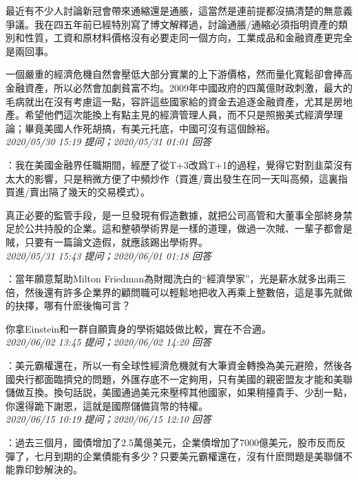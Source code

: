 \documentclass[twocolumn]{ctexart}
\begin{document}
最近有不少人討論新冠會帶來通縮還是通脹，這當然是連前提都沒搞清楚的無意義爭議。我在四五年前已經特別寫了博文解釋過，討論通脹/通縮必須指明資產的類別和性質，工資和原材料價格沒有必要走同一個方向，工業成品和金融資產更完全是兩回事。

一個嚴重的經濟危機自然會壓低大部分實業的上下游價格，然而量化寬鬆卻會捧高金融資產，所以必然會加劇貧富不均。2009年中國政府的四萬億財政刺激，最大的毛病就出在沒有考慮這一點，容許這些國家給的資金去追逐金融資產，尤其是房地產。希望他們這次能換上有點主見的經濟管理人員，而不只是照搬美式經濟學理論；畢竟美國人作死胡搞，有美元托底，中國可沒有這個餘裕。
\\

\textit{\hfill\noindent\small 2020/05/30 15:19 提问；2020/05/31 01:01 回答}

：我在美國金融界任職期間，經歷了從T+3改爲T+1的過程，覺得它對割韭菜沒有太大的影響，只是稍微方便了中頻炒作（買進/賣出發生在同一天叫高頻，這裏指買進/賣出隔了幾天的交易模式）。

真正必要的監管手段，是一旦發現有假造數據，就把公司高管和大董事全部終身禁足於公共持股的企業。這和整頓學術界是一樣的道理，做過一次賊、一輩子都會是賊，只要有一篇論文造假，就應該踢出學術界。
\\

\textit{\hfill\noindent\small 2020/05/31 15:43 提问；2020/06/01 01:18 回答}

：當年願意幫助Milton Friedman為財閥洗白的“經濟學家”，光是薪水就多出兩三倍，然後還有許多企業界的顧問職可以輕鬆地把收入再乘上整數倍，這是事先就做的抉擇，哪有什麽後悔可言？

你拿Einstein和一群自願賣身的學術娼妓做比較，實在不合適。
\\

\textit{\hfill\noindent\small 2020/06/02 13:45 提问；2020/06/02 14:20 回答}

：美元霸權還在，所以一有全球性經濟危機就有大筆資金轉換為美元避險，然後各國央行都面臨擠兌的問題，外匯存底不一定夠用，只有美國的親密盟友才能和美聯儲做互換。換句話説，美國通過美元來壓榨其他國家，如果稍擡貴手、少刮一點，你還得跪下謝恩，這就是國際儲備貨幣的特權。
\\

\textit{\hfill\noindent\small 2020/06/15 10:19 提问；2020/06/15 12:10 回答}

：過去三個月，國債增加了2.5萬億美元，企業債增加了7000億美元，股市反而反彈了，七月到期的企業債能有多少？只要美元霸權還在，沒有什麽問題是美聯儲不能靠印鈔解決的。
\\
\end{document}
